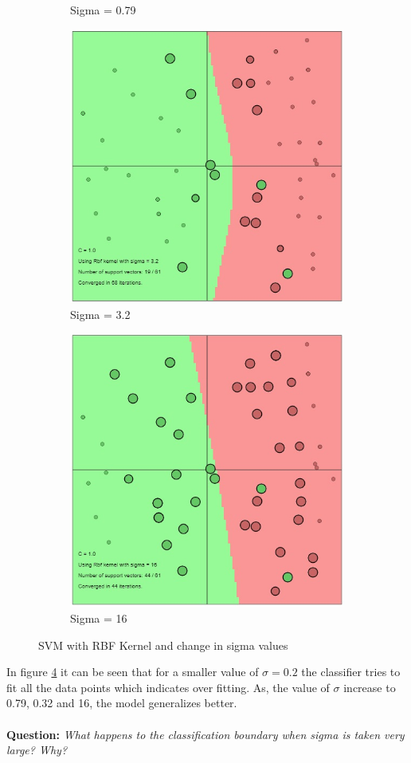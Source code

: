 \documentclass[12pt]{report}
\begin{document}
{\begin{figure}[!ht]
\begin{subfigure}{.255\textwidth}
		\caption{Sigma = 0.79}
		\label{fig:RBF_sig0.79}
	\end{subfigure}%
	\begin{subfigure}{.255\textwidth}
		\centering
		\includegraphics[width=0.8\linewidth]{RBF_sigma(3.2).jpg}
		\caption{Sigma = 3.2}
		\label{fig:RBF_sig3.2}
	\end{subfigure}%
	\begin{subfigure}{.255\textwidth}
		\centering
		\includegraphics[width=0.8\linewidth]{RBF_sigma(16).jpg}
		\caption{Sigma = 16}
		\label{fig:RBF_sig16}
	\end{subfigure}%
	\caption{SVM with RBF Kernel and change in sigma values}
	\label{fig:RBF_sig}
\end{figure}
In figure \ref{fig:RBF_sig} it can be seen that for a smaller value of $\sigma = 0.2$
the classifier tries to fit all the data points which indicates over fitting. As, the value of $\sigma$ increase to 0.79, 0.32 and 16, the model generalizes better. \\\\
\textbf{Question:} \textit{What happens to the classification boundary when sigma is taken very large? Why?}

}
\end{document}
